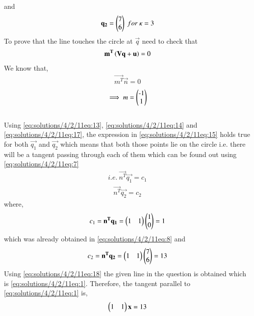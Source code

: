 and
\begin{align}
\mathbf{q_2} = \begin{pmatrix}7 \\ 6\end{pmatrix} \ for \ \kappa = 3 \label{eq:solutions/4/2/11eq:14}
\end{align}
To prove that the line touches the circle at $\vec{q}$ need to check that
\begin{align}
\mathbf{m^T}\left(\mathbf{V}\mathbf{q}+\mathbf{u}\right) = 0 \label{eq:solutions/4/2/11eq:15}
\end{align}
We know that,
\begin{align}
\vec{m^T}\vec{n} = 0 \label{eq:solutions/4/2/11eq:16}
\end{align}
\begin{align}
\implies m = \myvec{$-$1 \\ 1} \label{eq:solutions/4/2/11eq:17} 
\end{align}\\
Using \eqref{eq:solutions/4/2/11eq:13}, \eqref{eq:solutions/4/2/11eq:14} and \eqref{eq:solutions/4/2/11eq:17}, the expression in \eqref{eq:solutions/4/2/11eq:15} holds true for both $\vec{q_1}$ and $\vec{q_2}$ which means that both those points lie on the circle i.e. there will be a tangent passing through each of them which can be found out using \eqref{eq:solutions/4/2/11eq:7}
\begin{align}
i.e. \ \vec{n^T}\vec{q_1} = c_1 \label{eq:solutions/4/2/11eq:18}
\end{align}
\begin{align}
\vec{n^T}\vec{q_2} = c_2 \label{eq:solutions/4/2/11eq:19}
\end{align}
where,
\begin{align}
c_1 = \mathbf{n^Tq_1} = \begin{pmatrix}1 & 1\end{pmatrix}\begin{pmatrix}1 \\ 0\end{pmatrix} = 1  \label{eq:solutions/4/2/11eq:20}
\end{align}
which was already obtained in \eqref{eq:solutions/4/2/11eq:8} and\\
\begin{align}
c_2 = \mathbf{n^Tq_2} = \begin{pmatrix}1 & 1\end{pmatrix}\begin{pmatrix}7 \\ 6\end{pmatrix} = 13 \label{eq:solutions/4/2/11eq:21}
\end{align}
Using \eqref{eq:solutions/4/2/11eq:18} the given line in the question is obtained which is \eqref{eq:solutions/4/2/11eq:1}.
Therefore, the tangent parallel to \eqref{eq:solutions/4/2/11eq:1} is,
\begin{align}
\begin{pmatrix}1 & 1\end{pmatrix}\mathbf{x} = 13 \label{eq:solutions/4/2/11eq:22}
\end{align}\\
